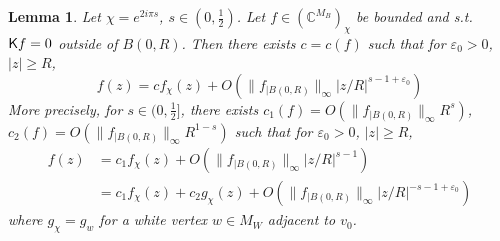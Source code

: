 \documentclass[10pt]{article}
\newcommand{\C}{\mathbb{C}}
\newcommand{\eps}{\varepsilon}
\newcommand{\rK}{{\sf K}}
\newtheorem{Lem}[thm]{Lemma}
\begin{document}
\begin{Lem}\label{Lem:moninf}
Let $\chi=e^{2i\pi s}$, $s\in (0,\frac 12)$. Let $f\in (\C^{M_B})_\chi$ be bounded and s.t. $\rK f=0$ outside of $B(0,R)$. Then there exists $c=c(f)$ such that for $\eps_0>0$, $|z|\geq R$,
$$f(z)=cf_\chi(z)+O(\|f_{|B(0,R)}\|_\infty |z/R|^{s-1+\eps_0})$$
More precisely, for $s\in (0,\frac 12]$, there exists $c_1(f)=O(\|f_{|B(0,R)}\|_\infty R^{s})$, $c_2(f)=O(\|f_{|B(0,R)}\|_\infty R^{1-s})$ such that for $\eps_0>0$, $|z|\geq R$,
\begin{align*}
f(z)&=c_1f_\chi(z)+O(\|f_{|B(0,R)}\|_\infty|z/R|^{s-1})\\
&=c_1f_\chi(z)+c_2g_\chi(z)+O(\|f_{|B(0,R)}\|_\infty|z/R|^{-s-1+\eps_0})
\end{align*}
where $g_\chi=g_w$ for a white vertex $w\in M_W$ adjacent to $v_0$.
\end{Lem}
\end{document}
